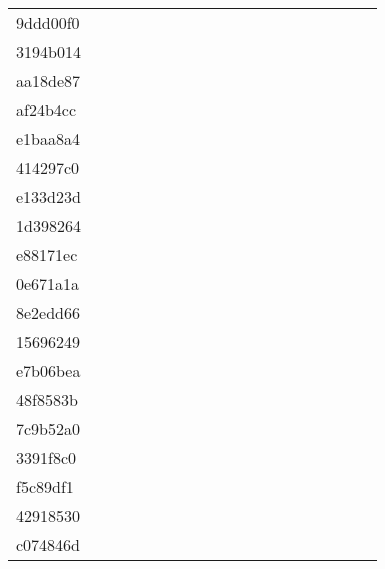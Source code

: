 \begin{table*}[htb]
\begin{tabular}{l|cccccccccccccccccc}
9ddd00f0  & \C & \X & \X & \X & \X & \X & \X & \X & \X & \X & \X & \C & \X & \C & \C & \X & \C \\
3194b014  & \C & \X & \C & \C & \X & \X & \X & \C & \C & \X & \C & \X & \C & \C & \C & \C & \C \\
aa18de87  & \C & \X & \C & \C & \X & \C & \C & \C & \C & \C & \C & \C & \C & \C & \C & \C & \C \\
af24b4cc  & \C & \X & \C & \C & \X & \C & \C & \C & \C & \C & \C & \C & \C & \C & \C & \C & \C \\
e1baa8a4  & \C & \X & \C & \C & \C & \C & \C & \C & \C & \C & \C & \C & \C & \C & \C & \C & \C \\
414297c0  & \C & \X & \X & \X & \X & \X & \X & \X & \X & \X & \X & \X & \X & \C & \C & \X & \X \\
e133d23d  & \C & \X & \C & \X & \X & \X & \X & \X & \X & \X & \X & \X & \X & \C & \C & \C & \C \\
1d398264  & \C & \X & \X & \X & \X & \C & \X & \X & \X & \X & \X & \X & \C & \C & \C & \C & \C \\
e88171ec  & \C & \X & \X & \X & \X & \X & \X & \X & \X & \X & \X & \X & \X & \C & \C & \C & \C \\
0e671a1a  & \C & \X & \X & \X & \X & \X & \X & \X & \X & \X & \X & \C & \X & \C & \C & \C & \C \\
8e2edd66  & \C & \X & \X & \X & \X & \X & \X & \X & \X & \X & \X & \C & \X & \C & \C & \C & \X \\
15696249  & \C & \X & \X & \X & \X & \X & \X & \X & \C & \X & \C & \C & \C & \C & \C & \C & \C \\
e7b06bea  & \C & \X & \X & \C & \X & \C & \C & \X & \X & \X & \C & \C & \C & \C & \C & \C & \C \\
48f8583b  & \C & \X & \X & \X & \X & \X & \X & \X & \C & \X & \X & \X & \X & \C & \C & \C & \X \\
7c9b52a0  & \C & \X & \X & \X & \X & \X & \X & \X & \X & \X & \X & \X & \X & \C & \C & \C & \C \\
3391f8c0  & \C & \X & \X & \X & \X & \X & \X & \X & \X & \X & \X & \X & \X & \X & \C & \C & \C \\
f5c89df1  & \C & \X & \X & \X & \X & \X & \X & \X & \X & \X & \X & \X & \X & \C & \C & \X & \X \\
42918530  & \C & \X & \X & \X & \X & \X & \X & \X & \X & \X & \X & \X & \X & \X & \C & \C & \C \\
c074846d  & \C & \X & \C & \X & \X & \X & \X & \C & \C & \C & \C & \C & \C & \C & \C & \C & \X \\

\end{tabular}
\end{table*}
